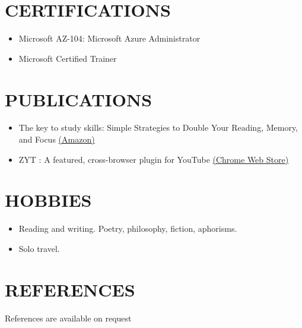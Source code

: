 \documentclass[margin, 10pt]{res} %
\begin{document}
\begin{resume}
\section{\ttfamily CERTIFICATIONS}
\begin{itemize}
\item Microsoft AZ-104: Microsoft Azure Administrator 
\item Microsoft Certified Trainer
\end{itemize}
\section{\ttfamily PUBLICATIONS}
\begin{itemize}
\item The key to study skills: Simple Strategies to Double Your Reading, Memory, and Focus \hfill \href{https://amzn.to/3myBJlJ}{(Amazon)}
\item ZYT : A featured, cross-browser plugin for YouTube \hfill 
\href{https://github.com/inversepolarity/ZYT}{(Chrome Web Store)}
\
\end{itemize}
\section{\ttfamily HOBBIES}
\begin{itemize}
\item Reading and writing. Poetry, philosophy, fiction, aphorisms. 
\item Solo travel.
\end{itemize}
\section{\ttfamily REFERENCES}
References are available on request


\end{resume}
\end{document}
